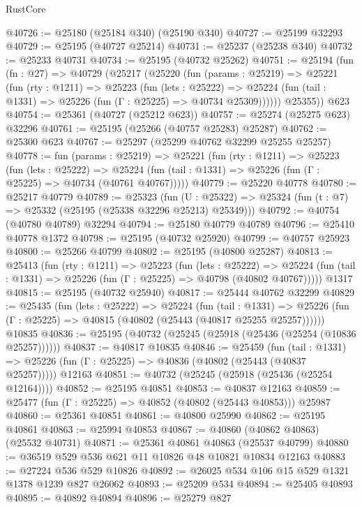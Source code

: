 \begin{lexlean}{RustCore}
\begin{coremodule}
@40726 := @25180 (@25184 @340) (@25190 @340)
@40727 := @25199 @32293
@40729 := @25195 (@40727 @25214)
@40731 := @25237 (@25238 @340)
@40732 := @25233 @40731
@40734 := @25195 (@40732 @25262)
@40751 := @25194
    (fun (fn : @27) =>
    @40729
      (@25217
        (@25220
          (fun (params : @25219) =>
          @25221
            (fun (rty : @1211) =>
            @25223
              (fun (lets : @25222) =>
              @25224 (fun (tail : @1331) => @25226 (fun (Γ : @25225) => @40734 @25309))))))
        @25355))
    @623
@40754 := @25361 (@40727 (@25212 @623))
@40757 := @25274 (@25275 @623) @32296
@40761 := @25195 (@25266 (@40757 @25283) @25287)
@40762 := @25300 @623
@40767 := @25297 (@25299 @40762 @32299 @25255 @25257)
@40778 := fun (params : @25219) =>
  @25221
    (fun (rty : @1211) =>
    @25223
      (fun (lets : @25222) =>
      @25224 (fun (tail : @1331) => @25226 (fun (Γ : @25225) => @40734 (@40761 @40767)))))
@40779 := @25220 @40778
@40780 := @25217 @40779
@40789 := @25323
    (fun (U : @25322) => @25324 (fun (t : @7) => @25332 (@25195 (@25338 @32296 @25213) @25349)))
@40792 := @40754 (@40780 @40789) @32294
@40794 := @25180 @40779 @40789
@40796 := @25410 @40778 @1372
@40798 := @25195 (@40732 @25920)
@40799 := @40757 @25923
@40800 := @25266 @40799
@40802 := @25195 (@40800 @25287)
@40813 := @25413
    (fun (rty : @1211) =>
    @25223
      (fun (lets : @25222) =>
      @25224 (fun (tail : @1331) => @25226 (fun (Γ : @25225) => @40798 (@40802 @40767)))))
    @1317
@40815 := @25195 (@40732 @25940)
@40817 := @25444 @40762 @32299
@40829 := @25435
    (fun (lets : @25222) =>
    @25224
      (fun (tail : @1331) =>
      @25226 (fun (Γ : @25225) => @40815 (@40802 (@25443 (@40817 @25255 @25257))))))
    @10835
@40836 := @25195 (@40732 (@25245 (@25918 (@25436 (@25254 (@10836 @25257))))))
@40837 := @40817 @10835
@40846 := @25459
    (fun (tail : @1331) => @25226 (fun (Γ : @25225) => @40836 (@40802 (@25443 (@40837 @25257)))))
    @12163
@40851 := @40732 (@25245 (@25918 (@25436 (@25254 @12164))))
@40852 := @25195 @40851
@40853 := @40837 @12163
@40859 := @25477 (fun (Γ : @25225) => @40852 (@40802 (@25443 @40853))) @25987
@40860 := @25361 @40851
@40861 := @40800 @25990
@40862 := @25195 @40861
@40863 := @25994 @40853
@40867 := @40860 (@40862 @40863) (@25532 @40731)
@40871 := @25361 @40861 @40863 (@25537 @40799)
@40880 := @36519 @529 @536 @621 @11 @10826 @48 @10821 @10834 @12163
@40883 := @27224 @536 @529 @10826
@40892 := @26025 @534 @106 @15 @529 @1321 @1378 @1239 @827 @26062
@40893 := @25209 @534
@40894 := @25405 @40893
@40895 := @40892 @40894
@40896 := @25279 @827

\end{coremodule}
\end{lexlean}
